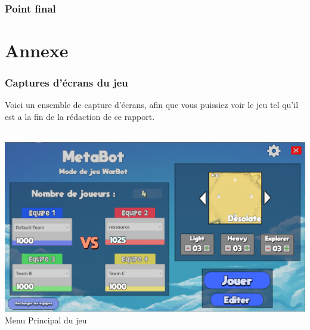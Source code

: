 \documentclass{report}
\begin{document}
\section{Point final}

\part{Annexe}
\section{Captures d'écrans du jeu}
Voici un ensemble de capture d’écrans, afin que vous puissiez voir le jeu tel qu’il est a la fin de la rédaction de ce rapport.

\paragraph{}
\begin{adjustwidth}{-3em}{-3em}
\begin{center}
\includegraphics[scale=0.5]{DATA/menuprincipal.png}
 {Menu Principal du jeu}
\end{center}
\end{adjustwidth}
\paragraph{}
\end{document}
